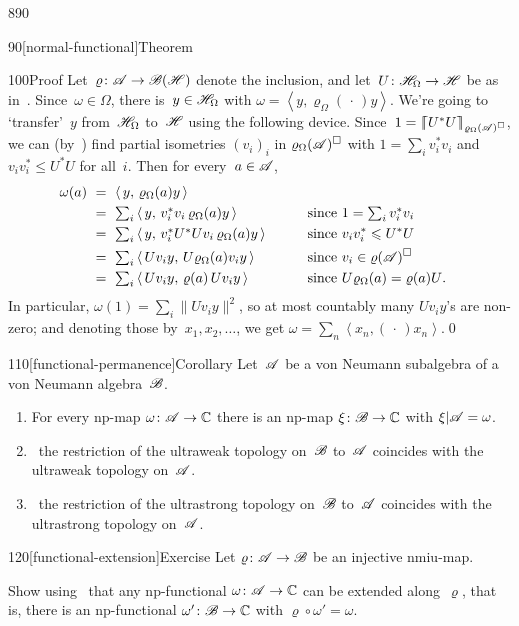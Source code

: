\begin{parsec}{890}
\begin{point}{90}[normal-functional]{Theorem}
\begin{point}{100}{Proof}
Let~$\varrho\colon \mathscr{A}\to\mathscr{B}(\mathscr{H})$
denote the inclusion,
and let~$U\colon \mathscr{H}_\Omega\to\mathscr{H}$
be as in~.
Since~$\omega\in\Omega$,
there is~$y\in\mathscr{H}_\Omega$
with $\omega = \left<y,\varrho_\Omega(\,\cdot\,)y\right>$.
We're going to `transfer'~$y$ from~$\mathscr{H}_\Omega$ to~$\mathscr{H}$
using the following device.
Since~$1=\left\lceil\!\!\left\lceil U^*U\right\rceil\!\!\right\rceil_{\varrho_\Omega(\mathscr{A})^\square}$,
we can 
(by~)
find partial isometries $(v_i)_i$ in
$\varrho_\Omega(\mathscr{A})^\square$
with $1=\sum_i v_i^*v_i$
and $v_iv_i^*\leq U^*U$
for all~$i$.
Then for every~$a\in\mathscr{A}$,
\begin{alignat*}{3}
	\textstyle
\omega(a)\  &=\
	\textstyle
	\left<\,y, \,\varrho_\Omega(a)y\,\right> 
	\\
&= 
	\textstyle
	\ \sum_i \left<\,y,\,  v_i^*v_i\, \varrho_\Omega(a) y \,\right>
	&&\qquad 
	\textstyle
	\text{since $1=\sum_i v_i^*v_i$}
	\\
&= 
	\textstyle
	\ \sum_i \left<\,y,\,  v_i^* U^*Uv_i \,\varrho_\Omega(a)y\, \right>
	&&\qquad\text{since $v_iv_i^*\leqslant U^*U$}
	\\
	&= 
	\textstyle
	\ \sum_i \left<\,Uv_i y,\, U \varrho_\Omega(a)v_i y\, \right>
	&&\qquad\text{since $v_i \in \varrho(\mathscr{A})^\square$}
	\\
	&= 
	\textstyle
	\ \sum_i \left<\,Uv_i y,\, \varrho(a) \, Uv_i y\, \right>
	&&\qquad\text{since $U\varrho_\Omega(a)=\varrho(a) U$}.
\end{alignat*}
In particular, $\omega(1)=\sum_i \|Uv_i y\|^2$,
so at most countably many $Uv_iy$'s are non-zero;
and denoting those by~$x_1,x_2,\dotsc$,
we get $\omega = \sum_n \left<x_n,(\,\cdot\,)x_n\right>$.\qed
\end{point}
\end{point}
\begin{point}{110}[functional-permanence]{Corollary}%
Let~$\mathscr{A}$ be a von Neumann subalgebra
of a von Neumann algebra~$\mathscr{B}$.
\begin{enumerate}
\item
For every np-map $\omega\colon \mathscr{A}\to\mathbb{C}$
there is an np-map $\xi\colon \mathscr{B}\to\mathbb{C}$
with $\xi|\mathscr{A}=\omega$.
\item%
\ 
the restriction of the ultraweak topology on~$\mathscr{B}$
to~$\mathscr{A}$ coincides with the ultraweak topology on~$\mathscr{A}$.
\item
\Define{Ultrastrong permanence:}\ 
the restriction of the ultrastrong topology on~$\mathscr{B}$
to~$\mathscr{A}$ coincides with the ultrastrong topology on~$\mathscr{A}$.
\end{enumerate}
\end{point}
\begin{point}{120}[functional-extension]{Exercise}%
Let $\varrho\colon \mathscr{A}\to\mathscr{B}$
be an injective nmiu-map.

Show 
using~
that any np-functional
$\omega\colon \mathscr{A}\to\mathbb{C}$
can be extended along~$\varrho$,
that is,
there is an np-functional
$\omega'\colon \mathscr{B}\to\mathbb{C}$
with $\varrho\circ \omega' = \omega$.

\end{point}
\end{parsec}
